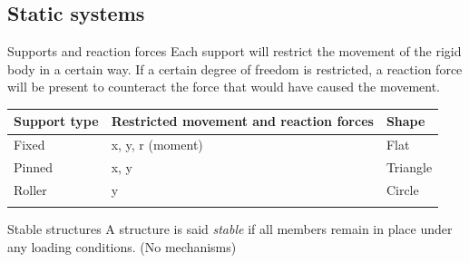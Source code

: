 \subsection{Static systems}
\begin{definition}
    {Supports and reaction forces}
    Each support will restrict the movement of the rigid body in a certain way. If a certain degree of freedom is restricted, a reaction force will be present to counteract the force that would have caused the movement.
    \begin{table}[H]
        \begin{tabular}{lll}
            \textbf{Support type} & \textbf{Restricted movement and reaction forces} & \textbf{Shape} \\ \hline
            Fixed                 & x, y, r (moment)                                 & Flat           \\ \arrayrulecolor{lightgray}\hline
            Pinned                & x, y                                             & Triangle       \\ \arrayrulecolor{lightgray}\hline
            Roller                & y                                                & Circle         \\ \arrayrulecolor{lightgray}\hline
        \end{tabular}
    \end{table}
\end{definition}
\begin{definition}
    {Stable structures}
    A structure is said \emph{stable} if all members remain in place under any loading conditions. (No mechanisms)
\end{definition}

